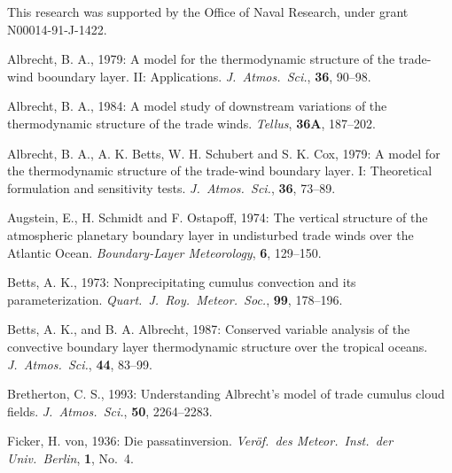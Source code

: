 \acknowledgments   This research was supported by the Office of Naval
Research, under grant N00014-91-J-1422.


\vfill
\eject





\beginreferences


Albrecht, B. A., 1979:  A model for the thermodynamic structure of the
trade-wind booundary layer. II: Applications.  {\sl J.\ Atmos.\ Sci.},
{\bf 36}, 90--98.


Albrecht, B. A., 1984:  A model study of downstream variations of the
thermodynamic structure of the trade winds.  {\sl Tellus},
{\bf 36A}, 187--202.

Albrecht, B. A., A. K. Betts, W. H. Schubert and S. K. Cox, 1979:  A model for
the thermodynamic structure of the trade-wind boundary layer. I: Theoretical
formulation and sensitivity tests.  {\sl J.\ Atmos.\ Sci.},
{\bf 36}, 73--89.

Augstein, E., H. Schmidt and F. Ostapoff, 1974: The vertical structure of the
atmospheric planetary boundary layer in undisturbed trade winds over the
Atlantic Ocean. {\sl Boundary-Layer Meteorology}, {\bf 6}, 129--150.

Betts, A. K., 1973: Nonprecipitating cumulus convection and its
parameterization. {\sl Quart.\ J.\ Roy.\ Meteor.\ Soc.}, {\bf 99}, 178--196.

Betts, A. K., and B. A. Albrecht, 1987:  Conserved variable analysis of the
convective boundary layer thermodynamic structure over the tropical oceans. 
{\sl J.\ Atmos.\ Sci.}, {\bf 44}, 83--99.

Bretherton, C. S., 1993:  Understanding Albrecht's model of trade cumulus
cloud fields.  {\sl J.\ Atmos.\ Sci.}, {\bf 50}, 2264--2283.



Ficker, H. von, 1936: Die passatinversion. {\sl Ver\"of.\ des Meteor.\ Inst.\
der Univ.\ Berlin}, {\bf 1}, No.~4.

